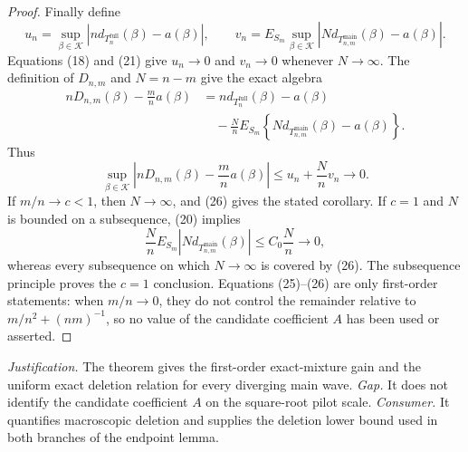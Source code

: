 \documentclass{article}
\begin{document}
\begin{proof}
Finally define
\[
u_n=\sup_{\beta\in\mathcal K}
\left|n d_{T_n^{\mathrm{full}}}(\beta)-a(\beta)\right|,
\qquad
v_n=E_{S_m}\sup_{\beta\in\mathcal K}
\left|N d_{T_{n,m}^{\mathrm{main}}}(\beta)-a(\beta)\right|.
\tag{24}
\]
Equations (18) and (21) give \(u_n\to0\) and \(v_n\to0\) whenever \(N\to\infty\).  The definition of \(D_{n,m}\) and \(N=n-m\) give the exact algebra
\[
\begin{aligned}
nD_{n,m}(\beta)-\frac mn a(\beta)
&=n d_{T_n^{\mathrm{full}}}(\beta)-a(\beta)\\
&\quad-\frac Nn E_{S_m}
\left\{N d_{T_{n,m}^{\mathrm{main}}}(\beta)-a(\beta)\right\}.
\end{aligned}
\tag{25}
\]
Thus
\[
\sup_{\beta\in\mathcal K}
\left|nD_{n,m}(\beta)-\frac mn a(\beta)\right|
\leq u_n+\frac Nn v_n\longrightarrow0.
\tag{26}
\]
If \(m/n\to c<1\), then \(N\to\infty\), and (26) gives the stated corollary.  If \(c=1\) and \(N\) is bounded on a subsequence, (20) implies
\[
\frac Nn E_{S_m}\left|N d_{T_{n,m}^{\mathrm{main}}}(\beta)\right|
\leq C_0\frac Nn\longrightarrow0,
\tag{27}
\]
whereas every subsequence on which \(N\to\infty\) is covered by (26).  The subsequence principle proves the \(c=1\) conclusion.  Equations (25)--(26) are only first-order statements: when \(m/n\to0\), they do not control the remainder relative to \(m/n^2+(nm)^{-1}\), so no value of the candidate coefficient \(A\) has been used or asserted.
\end{proof}
\par\smallskip\noindent \textit{Justification.} The theorem gives the first-order exact-mixture gain and the uniform exact deletion relation for every diverging main wave. \textit{Gap.} It does not identify the candidate coefficient \(A\) on the square-root pilot scale. \textit{Consumer.} It quantifies macroscopic deletion and supplies the deletion lower bound used in both branches of the endpoint lemma.
\end{document}
